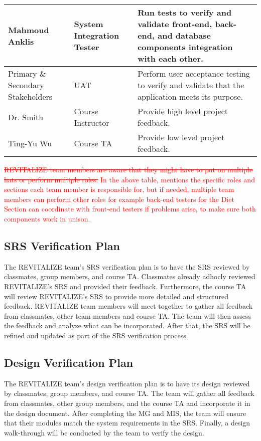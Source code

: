 \documentclass[12pt, titlepage]{article}
\begin{document}
\begin{table}[H]
\begin{tabular}{|p{3cm}|p{4cm}|p{7cm}|}
		\\ \hline  
		Mahmoud Anklis & System Integration Tester & Run tests to verify and validate front-end, back-end, and database components integration with each other.
		\\ \hline
		Primary \& Secondary Stakeholders & UAT & Perform user acceptance testing to verify and validate that the application meets its purpose.
		\\ \hline
		Dr. Smith & Course Instructor & Provide high level project feedback.
		\\ \hline
		Ting-Yu Wu & Course TA & Provide low level project feedback.
		\\ \hline
	\end{tabular}
\end{table}

\textcolor{red}{\sout{REVITALIZE team members are aware that they might have to put on multiple hats or perform multiple roles.}} \textcolor{red}{In the above table, mentions the specific roles and sections each team member is responsible for, but if needed, multiple team members can perform other roles for example back-end testers for the Diet Section can coordinate with front-end testers if problems arise, to make sure both components work in unison.}

\subsection{SRS Verification Plan}

The REVITALIZE team's SRS verification plan is to have the SRS reviewed by classmates, group members, and course TA. Classmates already adhocly reviewed REVITALIZE's SRS and provided their feedback. Furthermore, the course TA will review REVITALIZE's SRS to provide more detailed and structured feedback. REVITALIZE team members will meet together to gather all feedback from classmates, other team members and course TA. The team will then assess the feedback and analyze what can be incorporated. After that, the SRS will be refined and updated as part of the SRS verification process.

\subsection{Design Verification Plan}

The REVITALIZE team's design verification plan is to have its design reviewed by classmates, group members, and course TA. The team will gather all feedback from classmates, other group members, and the course TA and incorporate it in the design document. After completing the MG and MIS, the team will ensure that their modules match the system requirements in the SRS. Finally, a design walk-through will be conducted by the team to verify the design.
\end{document}
